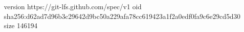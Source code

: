 version https://git-lfs.github.com/spec/v1
oid sha256:d62ad7d96b3c29642d9bc50a229afa78cc619423a1f2a0edf0fa9c6e29cd5d30
size 146194
